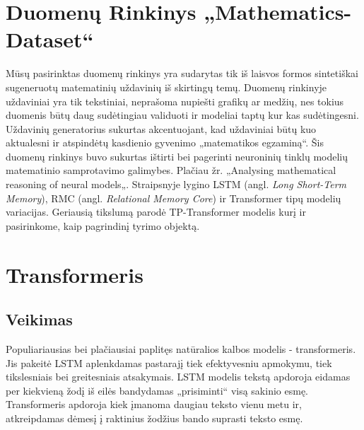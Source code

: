 \documentclass[conference]{IEEEtran}
\begin{document}
\section{Duomenų Rinkinys „Mathematics-Dataset“ \cite{dataset}}


Mūsų pasirinktas duomenų rinkinys yra sudarytas tik iš laisvos formos sintetiškai sugeneruotų matematinių uždavinių iš skirtingų temų. Duomenų rinkinyje uždaviniai yra tik tekstiniai, neprašoma nupiešti grafikų ar medžių, nes tokius duomenis būtų daug sudėtingiau validuoti ir modeliai taptų kur kas sudėtingesni. Uždavinių generatorius sukurtas akcentuojant, kad uždaviniai būtų kuo aktualesni ir atspindėtų kasdienio gyvenimo „matematikos egzaminą“. Šis duomenų rinkinys buvo sukurtas ištirti bei pagerinti neuroninių tinklų modelių matematinio samprotavimo galimybes. Plačiau žr. „Analysing mathematical reasoning of neural models„\cite{deeplab}. Straipsnyje lygino LSTM (angl. \textit{Long Short-Term Memory}), RMC (angl. \textit{Relational Memory Core}) ir Transformer tipų modelių variacijas. Geriausią tikslumą parodė TP-Transformer \cite{tptransformer} modelis kurį ir pasirinkome, kaip pagrindinį tyrimo objektą.






\section{Transformeris}

\subsection{Veikimas}
Populiariausias bei plačiausiai paplitęs natūralios kalbos modelis - transformeris. \cite{deeplab} Jis pakeitė LSTM aplenkdamas pastarajį tiek efektyvesniu apmokymu, tiek tikslesniais bei greitesniais atsakymais. LSTM modelis tekstą apdoroja eidamas per kiekvieną žodį iš eilės bandydamas „prisiminti“ visą sakinio esmę. Transformeris apdoroja kiek įmanoma daugiau teksto vienu metu ir, atkreipdamas dėmesį į raktinius žodžius bando suprasti teksto esmę.
\end{document}
